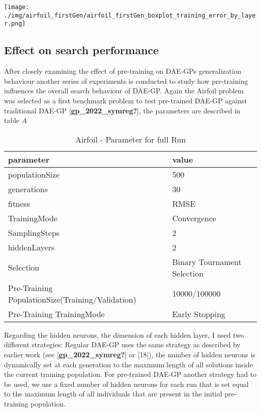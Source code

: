\documentclass[
  11pt,
]{article}
\let\origfigure\figure
\let\endorigfigure\endfigure
\renewenvironment{figure}[1][2] {
    \expandafter\origfigure\expandafter[H]
} {
    \endorigfigure
}
\begin{document}
\begin{figure}
\centering
\texttt{[image: ./img/airfoil\_firstGen/airfoil\_firstGen\_boxplot\_training\_error\_by\_layer.png]}
\caption{Airfoil - First Generation final Training Error for variable
number of hidden Layers}
\end{figure}

\hypertarget{effect-on-search-performance}{%
\subsection{Effect on search
performance}\label{effect-on-search-performance}}

After closely examining the effect of pre-training on DAE-GPs
generalization behaviour another series of experiments is conducted to
study how pre-training influences the overall search behaviour of
DAE-GP. Again the Airfoil problem was selected as a first benchmark
problem to test pre-trained DAE-GP against traditional DAE-GP
{[}\textbf{gp\_2022\_symreg?}{]}, the parameters are described in table
\(A\)

\begin{table}[!h]

\caption{\label{tab:airfoil_fullRun_2hl_maxIndSize_params}Airfoil - Parameter for full Run}
\centering
\begin{tabular}[t]{l|l}
\hline
\textbf{parameter} & \textbf{value}\\
\hline
populationSize & 500\\
\hline
generations & 30\\
\hline
fitness & RMSE\\
\hline
TrainingMode & Convergence\\
\hline
SamplingSteps & 2\\
\hline
hiddenLayers & 2\\
\hline
Selection & Binary Tournament Selection\\
\hline
Pre-Training PopulationSize(Training/Validation) & 10000/100000\\
\hline
Pre-Training TrainingMode & Early Stopping\\
\hline
\end{tabular}
\end{table}

Regarding the hidden neurons, the dimension of each hidden layer, I used
two different strategies: Regular DAE-GP uses the same strategy as
described by earlier work (see {[}\textbf{gp\_2022\_symreg?}{]} or
{[}18{]}), the number of hidden neurons is dynamically set at each
generation to the maximum length of all solutions inside the current
training population. For pre-trained DAE-GP another strategy had to be
used, we use a fixed number of hidden neurons for each run that is set
equal to the maximum length of all individuals that are present in the
initial pre-training population.
\end{document}
